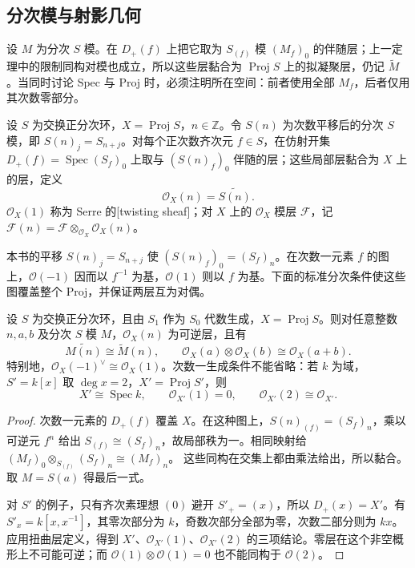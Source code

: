 \subsection{分次模与射影几何}
\label{b3:subsec:2403:03}

设 \(M\) 为分次 \(S\) 模。在 \(D_+(f)\) 上把它取为 \(S_{(f)}\) 模 \((M_f)_0\) 的伴随层；上一定理中的限制同构对模也成立，所以这些层黏合为 \(\operatorname{Proj}S\) 上的拟凝聚层，仍记 \(\widetilde M\)。当同时讨论 Spec 与 Proj 时，必须注明所在空间：前者使用全部 \(M_f\)，后者仅用其次数零部分。

\begin{definition}\label{b3:def:twisting-sheaf}
	设 \(S\) 为交换正分次环，\(X=\operatorname{Proj}S\)，\(n\in\mathbb Z\)。令 \(S(n)\) 为次数平移后的分次 \(S\) 模，即 \(S(n)_j=S_{n+j}\)。对每个正次数齐次元 \(f\in S\)，在仿射开集 \(D_+(f)=\operatorname{Spec}(S_f)_0\) 上取与 \((S(n)_f)_0\) 伴随的层；这些局部层黏合为 \(X\) 上的层，定义
	\[
		\mathcal O_X(n)=\widetilde{S(n)}.
	\]
	\(\mathcal O_X(1)\) 称为 Serre 的[twisting sheaf]；对 \(X\) 上的 \(\mathcal O_X\) 模层 \(\mathcal F\)，记 \(\mathcal F(n)=\mathcal F\otimes_{\mathcal O_X}\mathcal O_X(n)\)。
\end{definition}

本书的平移 \(S(n)_j=S_{n+j}\) 使 \((S(n)_f)_0=(S_f)_n\)。在次数一元素 \(f\) 的图上，\(\mathcal O(-1)\) 因而以 \(f^{-1}\) 为基，\(\mathcal O(1)\) 则以 \(f\) 为基。下面的标准分次条件使这些图覆盖整个 Proj，并保证两层互为对偶。

\begin{proposition}\label{b3:prop:standard-twists-invertible}\label{b3:prop:weighted-twist-counterexample}
	设 \(S\) 为交换正分次环，且由 \(S_1\) 作为 \(S_0\) 代数生成，\(X=\operatorname{Proj}S\)。则对任意整数 \(n,a,b\) 及分次 \(S\) 模 \(M\)，\(\mathcal O_X(n)\) 为可逆层，且有
	\[
		\widetilde{M(n)}\cong\widetilde M(n),\qquad \mathcal O_X(a)\otimes\mathcal O_X(b)\cong\mathcal O_X(a+b).
	\]
	特别地，\(\mathcal O_X(-1)^\vee\cong\mathcal O_X(1)\)。次数一生成条件不能省略：若 \(k\) 为域，\(S'=k[x]\) 取 \(\deg x=2\)，\(X'=\operatorname{Proj}S'\)，则
	\[
		X'\cong\operatorname{Spec}k,\qquad \mathcal O_{X'}(1)=0,\qquad \mathcal O_{X'}(2)\cong\mathcal O_{X'}.
	\]
\end{proposition}
\begin{proof}
	次数一元素的 \(D_+(f)\) 覆盖 \(X\)。在这种图上，\(S(n)_{(f)}=(S_f)_n\)，乘以可逆元 \(f^n\) 给出 \(S_{(f)}\cong(S_f)_n\)，故局部秩为一。相同映射给 \((M_f)_0\otimes_{S_{(f)}}(S_f)_n\cong(M_f)_n\)。 这些同构在交集上都由乘法给出，所以黏合。取 \(M=S(a)\) 得最后一式。

	对 \(S'\) 的例子，只有齐次素理想 \((0)\) 避开 \(S'_+=(x)\)，所以 \(D_+(x)=X'\)。有 \(S'_x=k[x,x^{-1}]\)，其零次部分为 \(k\)，奇数次部分全部为零，次数二部分则为 \(kx\)。应用扭曲层定义，得到 \(X'\)、\(\mathcal O_{X'}(1)\)、\(\mathcal O_{X'}(2)\) 的三项结论。零层在这个非空概形上不可能可逆；而 \(\mathcal O(1)\otimes\mathcal O(1)=0\) 也不能同构于 \(\mathcal O(2)\)。
\end{proof}


